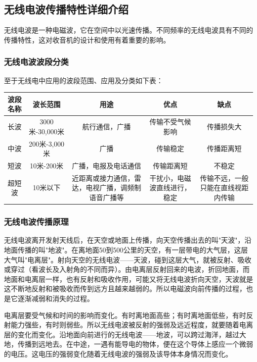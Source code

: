 \documentclass[12pt,UTF8]{ctexbook}
\begin{document}
\subsection{无线电波传播特性详细介绍}

无线电波是一种电磁波，它在空间中以光速传播。不同频率的无线电波具有不同的传播特性，这对收音机的设计和使用有着重要的影响。

\subsubsection{无线电波波段分类}

至于无线电中应用的波段范围、应用及分类如下表：

\begin{tabular}{|c|c|c|c|c|}
\hline
\textbf{波段名称} & \textbf{波长范围} & \textbf{用途} & \textbf{优点} & \textbf{缺点} \\
\hline
长波 & 3000米-30,000米 & 航行通信，广播 & 传输不受气候影响 & 传播损失大 \\
\hline
中波 & 200米-3,000米 & 广播 & 传输稳定 & 传播距离短 \\
\hline
短波 & 10米-200米 & 广播，电报及电话通信 & 传输距离短 & 不稳定 \\
\hline
超短波 & 10米以下 & 近距离或接力通信，雷达，电视广播，调频制语音广播等 & 干扰小，电磁波直线进行，稳定 & 传输不远，一般只能在直线视距内传输 \\
\hline
\end{tabular}

\subsubsection{无线电波传播原理}

无线电波离开发射天线后，在天空或地面上传播，向天空传播出去的叫"天波"，沿地面传播的叫"地波"。在离地面50到500公里的天空，有一层带电的大气层，这层大气叫"电离层"。射向天空的无线电波——天波，碰到这层大气，就被反射、吸收或穿过（看波长及入射角的不同而异）。由电离层反射回来的电波，折回地面，而地面和电离层一样，也有反射和吸收作用，可能又将无线电波折向天空，天波就是这不断地反射和被吸收而传到远方且越来越弱的。所以电磁波向前传播的过程，也是它逐渐减弱和消失的过程。

电离层要受气候和时间的影响而变化。有时离地面高些；有时离地面低些，有时反射能力强些，有时则弱些。所以无线电波被反射的强弱及远近程度，就要随着电离层的变化而变化。沿地面向前进行的无线电波——地波，可以跨过海洋，越过大地，传播到远地去。在中途，一遇有能导电的物体，便在这个导体上感应一个微弱的电压。这电压的强弱变化随着无线电波的强弱及该导体本身情况而变化。
\end{document}
